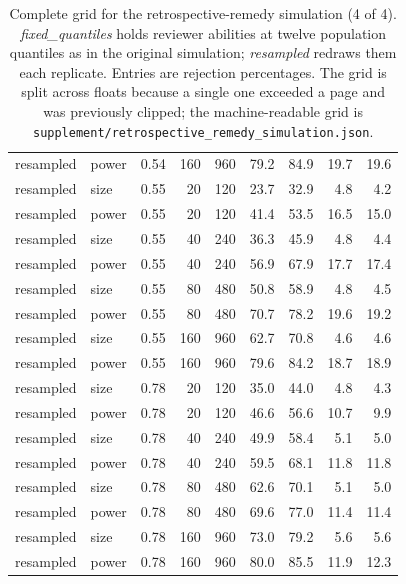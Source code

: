 \begin{table}[p]
\begin{tabular}{@{}llrrrrrrr@{}}
resampled & power & 0.54 & 160 & 960 & 79.2 & 84.9 & 19.7 & 19.6 \\
resampled & size & 0.55 & 20 & 120 & 23.7 & 32.9 & 4.8 & 4.2 \\
resampled & power & 0.55 & 20 & 120 & 41.4 & 53.5 & 16.5 & 15.0 \\
resampled & size & 0.55 & 40 & 240 & 36.3 & 45.9 & 4.8 & 4.4 \\
resampled & power & 0.55 & 40 & 240 & 56.9 & 67.9 & 17.7 & 17.4 \\
resampled & size & 0.55 & 80 & 480 & 50.8 & 58.9 & 4.8 & 4.5 \\
resampled & power & 0.55 & 80 & 480 & 70.7 & 78.2 & 19.6 & 19.2 \\
resampled & size & 0.55 & 160 & 960 & 62.7 & 70.8 & 4.6 & 4.6 \\
resampled & power & 0.55 & 160 & 960 & 79.6 & 84.2 & 18.7 & 18.9 \\
resampled & size & 0.78 & 20 & 120 & 35.0 & 44.0 & 4.8 & 4.3 \\
resampled & power & 0.78 & 20 & 120 & 46.6 & 56.6 & 10.7 & 9.9 \\
resampled & size & 0.78 & 40 & 240 & 49.9 & 58.4 & 5.1 & 5.0 \\
resampled & power & 0.78 & 40 & 240 & 59.5 & 68.1 & 11.8 & 11.8 \\
resampled & size & 0.78 & 80 & 480 & 62.6 & 70.1 & 5.1 & 5.0 \\
resampled & power & 0.78 & 80 & 480 & 69.6 & 77.0 & 11.4 & 11.4 \\
resampled & size & 0.78 & 160 & 960 & 73.0 & 79.2 & 5.6 & 5.6 \\
resampled & power & 0.78 & 160 & 960 & 80.0 & 85.5 & 11.9 & 12.3 \\
\bottomrule
\end{tabular}
\caption{Complete grid for the retrospective-remedy simulation (4 of 4). \emph{fixed\_quantiles} holds reviewer abilities at twelve population quantiles as in the original simulation; \emph{resampled} redraws them each replicate. Entries are rejection percentages. The grid is split across floats because a single one exceeded a page and was previously clipped; the machine-readable grid is \texttt{supplement/retrospective\_remedy\_simulation.json}.}
\label{tab:retrospective-remedies-full-4}
\end{table}
